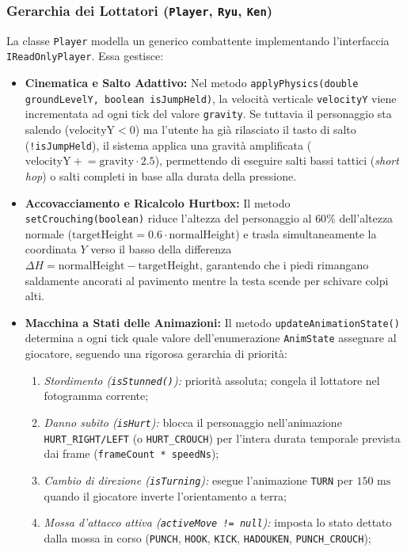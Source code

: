 \documentclass[11pt, a4paper]{article}
\begin{document}
\subsubsection{Gerarchia dei Lottatori (\texttt{Player}, \texttt{Ryu}, \texttt{Ken})}
La classe \texttt{Player} modella un generico combattente implementando l'interfaccia \texttt{IReadOnlyPlayer}. Essa gestisce:
\begin{itemize}
    \item \textbf{Cinematica e Salto Adattivo:} Nel metodo \texttt{applyPhysics(double groundLevelY, boolean isJumpHeld)}, la velocità verticale \texttt{velocityY} viene incrementata ad ogni tick del valore \texttt{gravity}. Se tuttavia il personaggio sta salendo ($\text{velocityY} < 0$) ma l'utente ha già rilasciato il tasto di salto (\texttt{!isJumpHeld}), il sistema applica una gravità amplificata ($\text{velocityY} \mathrel{+}= \text{gravity} \cdot 2.5$), permettendo di eseguire salti bassi tattici (\emph{short hop}) o salti completi in base alla durata della pressione.
    \item \textbf{Accovacciamento e Ricalcolo Hurtbox:} Il metodo \texttt{setCrouching(boolean)} riduce l'altezza del personaggio al $60\%$ dell'altezza normale ($\text{targetHeight} = 0.6 \cdot \text{normalHeight}$) e trasla simultaneamente la coordinata $Y$ verso il basso della differenza $\Delta H = \text{normalHeight} - \text{targetHeight}$, garantendo che i piedi rimangano saldamente ancorati al pavimento mentre la testa scende per schivare colpi alti.
    \item \textbf{Macchina a Stati delle Animazioni:} Il metodo \texttt{updateAnimationState()} determina a ogni tick quale valore dell'enumerazione \texttt{AnimState} assegnare al giocatore, seguendo una rigorosa gerarchia di priorità:
    \begin{enumerate}
        \item \emph{Stordimento (\texttt{isStunned()}):} priorità assoluta; congela il lottatore nel fotogramma corrente;
        \item \emph{Danno subito (\texttt{isHurt}):} blocca il personaggio nell'animazione \texttt{HURT\_RIGHT/LEFT} (o \texttt{HURT\_CROUCH}) per l'intera durata temporale prevista dai frame (\texttt{frameCount * speedNs});
        \item \emph{Cambio di direzione (\texttt{isTurning}):} esegue l'animazione \texttt{TURN} per $150\text{ ms}$ quando il giocatore inverte l'orientamento a terra;
        \item \emph{Mossa d'attacco attiva (\texttt{activeMove != null}):} imposta lo stato dettato dalla mossa in corso (\texttt{PUNCH}, \texttt{HOOK}, \texttt{KICK}, \texttt{HADOUKEN}, \texttt{PUNCH\_CROUCH});

\end{enumerate}
\end{itemize}
\end{document}
